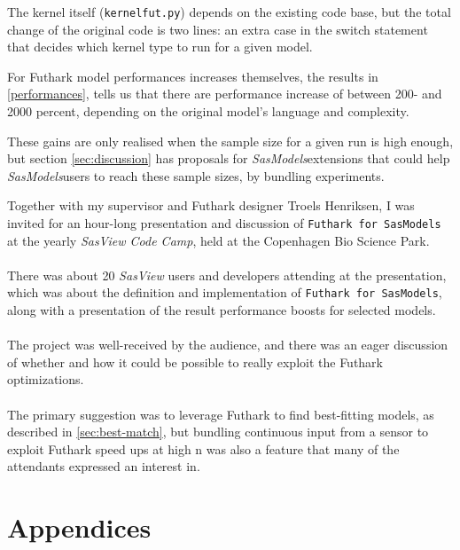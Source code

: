 \documentclass[11pt]{article}
\newcommand{\sasmodels}{\textit{SasModels}}
\newcommand{\sasview}{\textit{SasView}}
\newcommand{\futhark}{\texttt{Futhark for SasModels}}
\begin{document}
The kernel itself (\texttt{kernelfut.py}) depends on the existing code base, but
the total change of the original code is two lines: an extra case in the
switch statement that decides which kernel type to run for a given model.

For Futhark model performances increases themselves, the results in
\ref{performances}, tells us that there are performance increase of between
200- and 2000 percent, depending on the original model's language and
complexity.

These gains are only realised when the sample size for a given run is high
enough, but section \ref{sec:discussion} has proposals for \sasmodels extensions
that could help \sasmodels users to reach these sample sizes, by bundling
experiments.

\begin{mdframed}[
  frametitle={Presentation at \sasview{} Code Camp},
  nobreak=true
  ]
Together with my supervisor and Futhark designer Troels Henriksen,
I was invited for an hour-long presentation and discussion of \futhark{} at the
yearly \textit{SasView Code Camp}, held at the Copenhagen Bio Science Park.\\\\
There was about 20 \sasview{} users and developers attending at the presentation,
which was about the definition and implementation of \futhark{}, along with
a presentation of the result performance boosts for selected models.\\\\
The project was well-received by the audience, and there was an eager discussion
of whether and how it could be possible to really exploit the Futhark
optimizations.\\\\
The primary suggestion was to leverage Futhark to find best-fitting models,
as described in \ref{sec:best-match}, but bundling continuous input from
a sensor to exploit Futhark speed ups at high n was also a feature that many
of the attendants expressed an interest in.
\end{mdframed}





\section*{Appendices}
\end{document}
